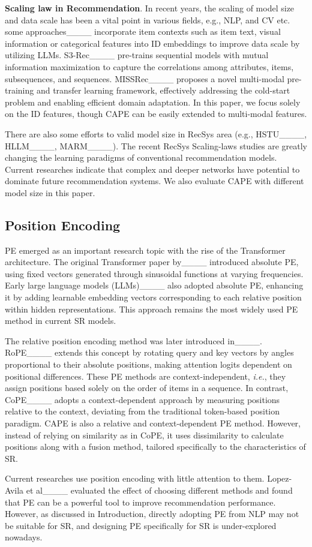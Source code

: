 \textbf{Scaling law in Recommendation}. In recent years, the scaling of model size and data scale has been a vital point in various fields, e.g., NLP, and CV etc. some approaches____ incorporate item contexts such as item text, visual information or categorical features into ID embeddings to improve data scale by utilizing LLMs. S3-Rec____ pre-trains sequential models with mutual information maximization to capture the correlations among attributes, items, subsequences, and sequences. MISSRec____ proposes a novel multi-modal pre-training and transfer learning framework, effectively addressing the cold-start problem and enabling efficient domain adaptation. In this paper, we focus solely on the ID features, though CAPE can be easily extended to multi-modal features. 

There are also some efforts to valid model size in RecSys area (e.g., HSTU____, HLLM____, MARM____). The recent RecSys Scaling-laws studies are greatly changing the learning paradigms of conventional recommendation models. Current researches indicate that complex and deeper networks have potential to dominate future recommendation systems. We also evaluate CAPE with different model size in this paper.


\subsection{Position Encoding} PE emerged as an important research topic with the rise of the Transformer architecture. The original Transformer paper by____ introduced absolute PE, using fixed vectors generated through sinusoidal functions at varying frequencies. Early large language models (LLMs)____ also adopted absolute PE, enhancing it by adding learnable embedding vectors corresponding to each relative position within hidden representations. This approach remains the most widely used PE method in current SR models.

The relative position encoding method was later introduced in____. RoPE____ extends this concept by rotating query and key vectors by angles proportional to their absolute positions, making attention logits dependent on positional differences. These PE methods are context-independent, \emph{i.e.}, they assign positions based solely on the order of items in a sequence. In contrast, CoPE____ adopts a context-dependent approach by measuring positions relative to the context, deviating from the traditional token-based position paradigm. CAPE is also a relative and context-dependent PE method. However, instead of relying on similarity as in CoPE, it uses dissimilarity to calculate positions along with a fusion method, tailored specifically to the characteristics of SR. 

Current researches use position encoding with little attention to them. Lopez-Avila et al____ evaluated the effect of choosing different methods and found that PE can be a powerful tool to improve recommendation performance. However, as discussed in Introduction, directly adopting PE from NLP may not be suitable for SR, and designing PE specifically for SR is under-explored nowadays.